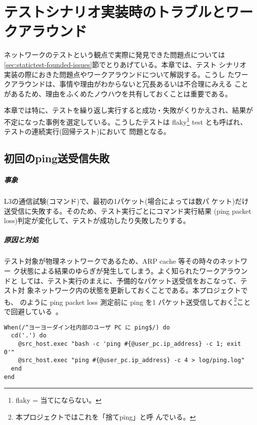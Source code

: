 
\chapter{テストシナリオ実装時のトラブルとワークアラウンド}
ネットワークのテストという観点で実際に発見できた問題点については
\ref{sec:statictest-founded-issues}節でとりあげている。本章では、テスト
シナリオ実装の際におきた問題点やワークアラウンドについて解説する。こうし
たワークアラウンドは、事情や理由がわからないと冗長あるいは不合理にみえる
ことがあるため、理由をふくめたノウハウを共有しておくことは重要である。

本章では特に、テストを繰り返し実行すると成功・失敗がくりかえされ、結果が
不定になった事例を選定している。こうしたテストは flaky\footnote{flaky =
当てにならない。} test とも呼ばれ、テストの連続実行(回帰テスト)において
問題となる。

 \section{初回のping送受信失敗}
 \label{sec:ping-probrem}

    \paragraph{事象}
L3の通信試験(コマンド)で、最初の1パケット(場合によっては数パ
ケット)だけ送受信に失敗する。そのため、テスト実行ごとにコマンド実行結果
(ping packet loss)判定が変化して、テストが成功したり失敗したりする。

    \paragraph{原因と対処}
テスト対象が物理ネットワークであるため、ARP cache 等その時々のネットワー
ク状態による結果のゆらぎが発生してしまう。よく知られたワークアラウンドと
しては、テスト実行のまえに、予備的なパケット送受信をおこなって、テスト対
象ネットワーク内の状態を更新しておくことである。本プロジェクトでも、
のように ping packet loss 測定前に ping を1
パケット送受信しておく\footnote{本プロジェクトではこれを「捨てping」と呼
んでいる。}ことで回避している~\cite{examples-pr49}。

\begin{lstlisting}[caption=予備的ping実行の例,label=lst:ping-workaround,linebackgroundcolor={\ifnum\value{lstnumber}=3 \color{green!30}\fi}]
When(/^ヨーヨーダイン社内部のユーザ PC に ping$/) do
  cd('.') do
    @src_host.exec "bash -c 'ping #{@user_pc.ip_address} -c 1; exit 0'"
    @src_host.exec "ping #{@user_pc.ip_address} -c 4 > log/ping.log"
  end
end
\end{lstlisting}

